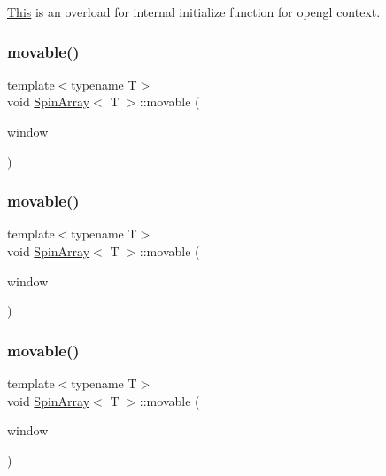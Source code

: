 \mbox{\hyperlink{classThis}{This}} is an overload for internal initialize function for opengl context. 

\mbox{\label{classSpinArray_ab2d41adf8269369e26c316684da70462}} 
\subsubsection{\texorpdfstring{movable()}{movable()}\hspace{0.1cm}{\footnotesize\ttfamily [1/3]}}
{\footnotesize\ttfamily template$<$typename T$>$ \\
void \mbox{\hyperlink{classSpinArray}{Spin\+Array}}$<$ T $>$\+::movable (\begin{DoxyParamCaption}\item[{G\+L\+F\+Wwindow $\ast$}]{window }\end{DoxyParamCaption})\hspace{0.3cm}{\ttfamily [inline]}}

\mbox{\label{classSpinArray_ab2d41adf8269369e26c316684da70462}} 
\subsubsection{\texorpdfstring{movable()}{movable()}\hspace{0.1cm}{\footnotesize\ttfamily [2/3]}}
{\footnotesize\ttfamily template$<$typename T$>$ \\
void \mbox{\hyperlink{classSpinArray}{Spin\+Array}}$<$ T $>$\+::movable (\begin{DoxyParamCaption}\item[{G\+L\+F\+Wwindow $\ast$}]{window }\end{DoxyParamCaption})\hspace{0.3cm}{\ttfamily [inline]}}

\mbox{\label{classSpinArray_ab2d41adf8269369e26c316684da70462}} 
\subsubsection{\texorpdfstring{movable()}{movable()}\hspace{0.1cm}{\footnotesize\ttfamily [3/3]}}
{\footnotesize\ttfamily template$<$typename T$>$ \\
void \mbox{\hyperlink{classSpinArray}{Spin\+Array}}$<$ T $>$\+::movable (\begin{DoxyParamCaption}\item[{G\+L\+F\+Wwindow $\ast$}]{window }\end{DoxyParamCaption})\hspace{0.3cm}{\ttfamily [inline]}}

